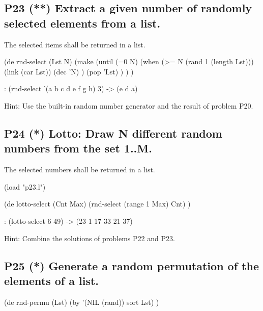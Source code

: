 \pagebreak{}
\subsection*{{P23} (**) Extract a given number of
randomly selected elements from a list.}
\label{sec:99-problems-P23}

The selected items shall be returned in a list.

\begin{wideverbatim}

(de rnd-select (Lst N)
   (make
      (until (=0 N)
         (when (>= N (rand 1 (length Lst)))
            (link (car Lst))
            (dec 'N) )
         (pop 'Lst) ) ) )

\end{wideverbatim}

\begin{wideverbatim}
   : (rnd-select '(a b c d e f g h) 3)
   -> (e d a)
\end{wideverbatim}

Hint: Use the built-in random number generator and the result of problem
P20.

\subsection*{{P24} (*) Lotto: Draw N different random
numbers from the set 1..M.}
\label{sec:99-problems-P24}

The selected numbers shall be returned in a list.

\begin{wideverbatim}

(load "p23.l")

(de lotto-select (Cnt Max)
   (rnd-select (range 1 Max) Cnt) )

\end{wideverbatim}

\begin{wideverbatim}
   : (lotto-select 6 49)
   -> (23 1 17 33 21 37)
\end{wideverbatim}

Hint: Combine the solutions of problems P22 and P23.

\pagebreak{}
\subsection*{{P25} (*) Generate a random permutation of
the elements of a list.}
\label{sec:99-problems-P25}

\begin{wideverbatim}

(de rnd-permu (Lst)
   (by '(NIL (rand)) sort Lst) )

\end{wideverbatim}

